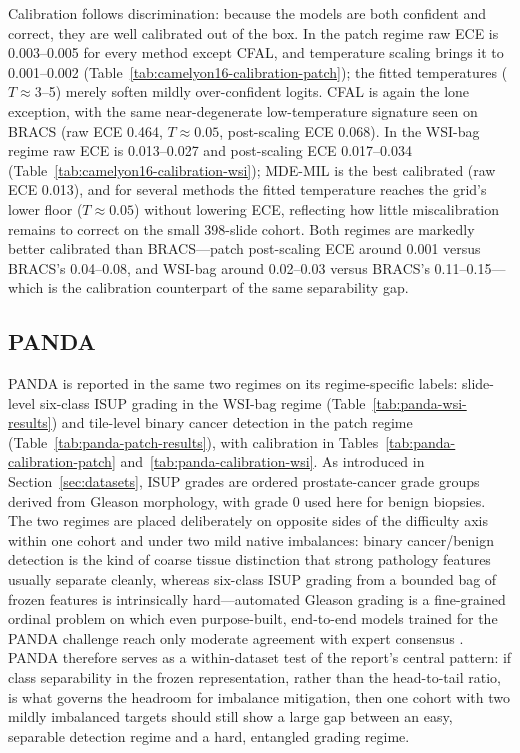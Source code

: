 \documentclass[11pt]{article}
\begin{document}
\noindent Calibration follows discrimination: because the models are both confident and correct, they are well calibrated out of the box. In the patch regime raw ECE is \num{0.003}--\num{0.005} for every method except CFAL, and temperature scaling brings it to \num{0.001}--\num{0.002} (Table~\ref{tab:camelyon16-calibration-patch}); the fitted temperatures ($T\approx\num{3}$--\num{5}) merely soften mildly over-confident logits. CFAL is again the lone exception, with the same near-degenerate low-temperature signature seen on BRACS (raw ECE \num{0.464}, $T\approx\num{0.05}$, post-scaling ECE \num{0.068}). In the WSI-bag regime raw ECE is \num{0.013}--\num{0.027} and post-scaling ECE \num{0.017}--\num{0.034} (Table~\ref{tab:camelyon16-calibration-wsi}); MDE-MIL is the best calibrated (raw ECE \num{0.013}), and for several methods the fitted temperature reaches the grid's lower floor ($T\approx\num{0.05}$) without lowering ECE, reflecting how little miscalibration remains to correct on the small \num{398}-slide cohort. Both regimes are markedly better calibrated than BRACS---patch post-scaling ECE around \num{0.001} versus BRACS's \num{0.04}--\num{0.08}, and WSI-bag around \num{0.02}--\num{0.03} versus BRACS's \num{0.11}--\num{0.15}---which is the calibration counterpart of the same separability gap.

\subsection{PANDA}
PANDA is reported in the same two regimes on its regime-specific labels: slide-level six-class ISUP grading in the WSI-bag regime (Table~\ref{tab:panda-wsi-results}) and tile-level binary cancer detection in the patch regime (Table~\ref{tab:panda-patch-results}), with calibration in Tables~\ref{tab:panda-calibration-patch} and~\ref{tab:panda-calibration-wsi}. As introduced in Section~\ref{sec:datasets}, ISUP grades are ordered prostate-cancer grade groups derived from Gleason morphology, with grade \num{0} used here for benign biopsies. The two regimes are placed deliberately on opposite sides of the difficulty axis within one cohort and under two mild native imbalances: binary cancer/benign detection is the kind of coarse tissue distinction that strong pathology features usually separate cleanly, whereas six-class ISUP grading from a bounded bag of frozen features is intrinsically hard---automated Gleason grading is a fine-grained ordinal problem on which even purpose-built, end-to-end models trained for the PANDA challenge reach only moderate agreement with expert consensus \citep{bulten2022panda}. PANDA therefore serves as a within-dataset test of the report's central pattern: if class separability in the frozen representation, rather than the head-to-tail ratio, is what governs the headroom for imbalance mitigation, then one cohort with two mildly imbalanced targets should still show a large gap between an easy, separable detection regime and a hard, entangled grading regime.
\end{document}
